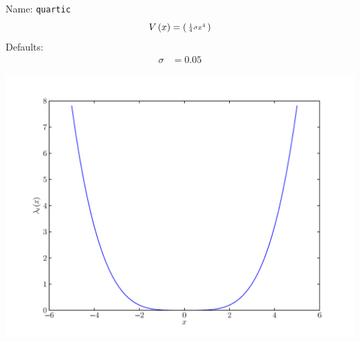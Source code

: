 \documentclass[a4paper,10pt]{report}
\begin{document}
\begin{minipage}{0.5\linewidth}
  Name:    \texttt{quartic}
  \begin{equation*}
    V\left( x \right) = \left(\begin{smallmatrix}\frac{1}{4} \sigma x^{4}\end{smallmatrix}\right)
  \end{equation*}
  Defaults:
  \begin{align*}
    \sigma & = 0.05
  \end{align*}
\end{minipage}
\begin{minipage}{0.5\linewidth}
  \begin{center}
    \includegraphics[scale=0.25]{./fig/quartic.pdf}
  \end{center}
\end{minipage}
\end{document}
